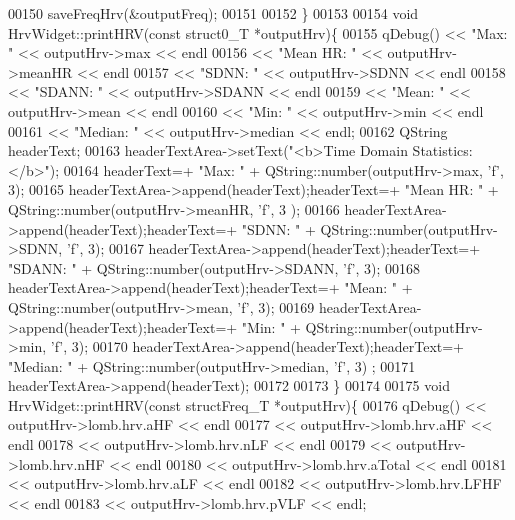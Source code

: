\begin{DoxyCode}
00150     saveFreqHrv(&outputFreq);
00151 
00152 \}
00153 
00154 \textcolor{keywordtype}{void} HrvWidget::printHRV(\textcolor{keyword}{const} struct0\_T *outputHrv)\{
00155     qDebug() << \textcolor{stringliteral}{"Max: "} << outputHrv->max << endl
00156             << \textcolor{stringliteral}{"Mean HR: "} << outputHrv->meanHR << endl
00157             << \textcolor{stringliteral}{"SDNN: "} << outputHrv->SDNN << endl
00158             << \textcolor{stringliteral}{"SDANN: "} << outputHrv->SDANN << endl
00159             << \textcolor{stringliteral}{"Mean: "} << outputHrv->mean << endl
00160             << \textcolor{stringliteral}{"Min: "} << outputHrv->min << endl
00161             << \textcolor{stringliteral}{"Median: "} << outputHrv->median << endl;
00162     QString headerText;
00163     headerTextArea->setText(\textcolor{stringliteral}{"<b>Time Domain Statistics: </b>"});
00164     headerText=+ \textcolor{stringliteral}{"Max: "} + QString::number(outputHrv->max, \textcolor{charliteral}{'f'}, 3);
00165     headerTextArea->append(headerText);headerText=+ \textcolor{stringliteral}{"Mean HR: "} + QString::number(outputHrv->meanHR, \textcolor{charliteral}{'f'}, 3
      );
00166     headerTextArea->append(headerText);headerText=+ \textcolor{stringliteral}{"SDNN: "} + QString::number(outputHrv->SDNN, \textcolor{charliteral}{'f'}, 3);
00167     headerTextArea->append(headerText);headerText=+ \textcolor{stringliteral}{"SDANN: "} + QString::number(outputHrv->SDANN, \textcolor{charliteral}{'f'}, 3);
00168     headerTextArea->append(headerText);headerText=+ \textcolor{stringliteral}{"Mean: "} + QString::number(outputHrv->mean, \textcolor{charliteral}{'f'}, 3);
00169     headerTextArea->append(headerText);headerText=+ \textcolor{stringliteral}{"Min: "} + QString::number(outputHrv->min, \textcolor{charliteral}{'f'}, 3);
00170     headerTextArea->append(headerText);headerText=+ \textcolor{stringliteral}{"Median: "} + QString::number(outputHrv->median, \textcolor{charliteral}{'f'}, 3)
      ;
00171     headerTextArea->append(headerText);
00172 
00173 \}
00174 
00175 \textcolor{keywordtype}{void} HrvWidget::printHRV(\textcolor{keyword}{const} structFreq\_T *outputHrv)\{
00176     qDebug() << outputHrv->lomb.hrv.aHF << endl
00177             << outputHrv->lomb.hrv.aHF << endl
00178             << outputHrv->lomb.hrv.nLF << endl
00179             << outputHrv->lomb.hrv.nHF << endl
00180             << outputHrv->lomb.hrv.aTotal << endl
00181             << outputHrv->lomb.hrv.aLF << endl
00182             << outputHrv->lomb.hrv.LFHF << endl
00183             << outputHrv->lomb.hrv.pVLF << endl;

\end{DoxyCode}
